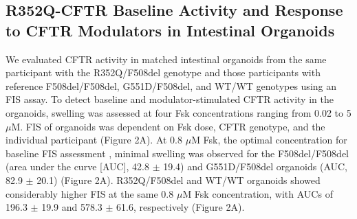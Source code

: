 \subsection{R352Q-CFTR Baseline Activity and Response to CFTR Modulators in Intestinal Organoids}

We evaluated CFTR activity in matched intestinal organoids from the same participant with the R352Q/F508del genotype and those participants with reference F508del/F508del, G551D/F508del, and WT/WT genotypes using an FIS assay. To detect baseline and modulator-stimulated CFTR activity in the organoids, swelling was assessed at four Fsk concentrations ranging from 0.02 to 5 $\mu$M. FIS of organoids was dependent on Fsk dose, CFTR genotype, and the individual participant (Figure 2A). At 0.8 $\mu$M Fsk, the optimal concentration for baseline FIS assessment \cite{dekkers2016}, minimal swelling was observed for the F508del/F508del (area under the curve [AUC], 42.8 $\pm$ 19.4) and G551D/F508del organoids (AUC, 82.9 $\pm$ 20.1) (Figure 2A). R352Q/F508del and WT/WT organoids showed considerably higher FIS at the same 0.8 $\mu$M Fsk concentration, with AUCs of 196.3 $\pm$ 19.9 and 578.3 $\pm$ 61.6, respectively (Figure 2A).


